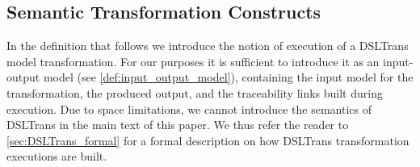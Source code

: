 % 
% 
% 

\subsection{Semantic Transformation Constructs}
\label{sec:DSLTrans_semantics}

In the definition that follows we introduce the notion of execution of a DSLTrans model transformation. For our purposes it is sufficient to introduce it as an input-output model (see \cref{def:input_output_model}), containing the input model for the transformation, the produced output, and the traceability links built during execution. Due to space limitations, we cannot introduce the semantics of DSLTrans in the main text of this paper. We thus refer the reader to \cref{sec:DSLTrans_formal} for a formal description on how DSLTrans transformation executions are built. 


